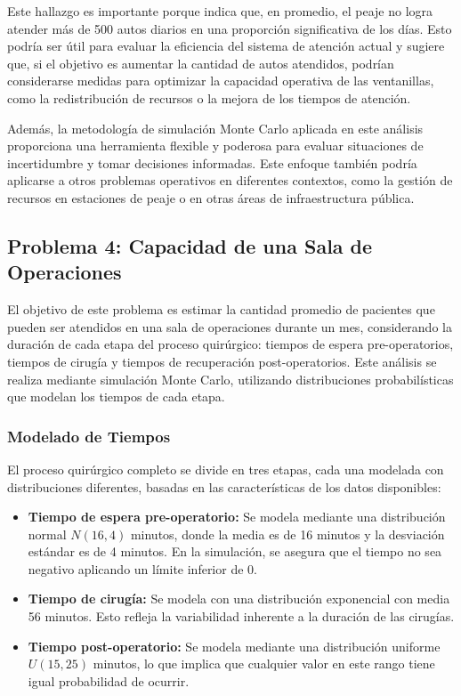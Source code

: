 \documentclass[12pt]{article}
\begin{document}
Este hallazgo es importante porque indica que, en promedio, el peaje no logra atender más de 500 autos diarios en una proporción significativa de los días. Esto podría ser útil para evaluar la eficiencia del sistema de atención actual y sugiere que, si el objetivo es aumentar la cantidad de autos atendidos, podrían considerarse medidas para optimizar la capacidad operativa de las ventanillas, como la redistribución de recursos o la mejora de los tiempos de atención.

Además, la metodología de simulación Monte Carlo aplicada en este análisis proporciona una herramienta flexible y poderosa para evaluar situaciones de incertidumbre y tomar decisiones informadas. Este enfoque también podría aplicarse a otros problemas operativos en diferentes contextos, como la gestión de recursos en estaciones de peaje o en otras áreas de infraestructura pública.



\subsection{Problema 4: Capacidad de una Sala de Operaciones}
El objetivo de este problema es estimar la cantidad promedio de pacientes que pueden ser atendidos en una sala de operaciones durante un mes, considerando la duración de cada etapa del proceso quirúrgico: tiempos de espera pre-operatorios, tiempos de cirugía y tiempos de recuperación post-operatorios. Este análisis se realiza mediante simulación Monte Carlo, utilizando distribuciones probabilísticas que modelan los tiempos de cada etapa.

\subsubsection{Modelado de Tiempos}
El proceso quirúrgico completo se divide en tres etapas, cada una modelada con distribuciones diferentes, basadas en las características de los datos disponibles:
\begin{itemize}
    \item \textbf{Tiempo de espera pre-operatorio:} Se modela mediante una distribución normal $N(16, 4)$ minutos, donde la media es de 16 minutos y la desviación estándar es de 4 minutos. En la simulación, se asegura que el tiempo no sea negativo aplicando un límite inferior de 0.
    \item \textbf{Tiempo de cirugía:} Se modela con una distribución exponencial con media 56 minutos. Esto refleja la variabilidad inherente a la duración de las cirugías.
    \item \textbf{Tiempo post-operatorio:} Se modela mediante una distribución uniforme $U(15, 25)$ minutos, lo que implica que cualquier valor en este rango tiene igual probabilidad de ocurrir.
\end{itemize}
\end{document}
